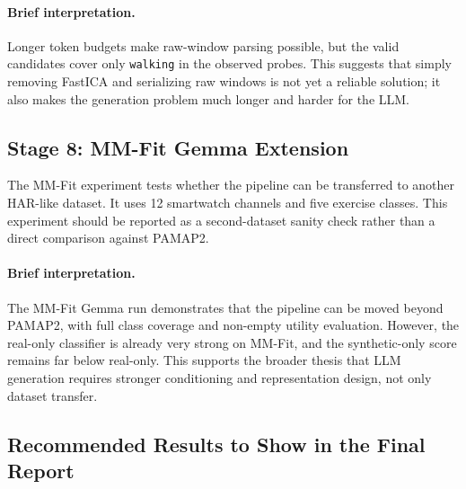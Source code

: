 \paragraph{Brief interpretation.}
Longer token budgets make raw-window parsing possible, but the valid candidates
cover only \texttt{walking} in the observed probes. This suggests that simply
removing FastICA and serializing raw windows is not yet a reliable solution; it
also makes the generation problem much longer and harder for the LLM.

\subsection*{Stage 8: MM-Fit Gemma Extension}

The MM-Fit experiment tests whether the pipeline can be transferred to another
HAR-like dataset. It uses 12 smartwatch channels and five exercise classes. This
experiment should be reported as a second-dataset sanity check rather than a
direct comparison against PAMAP2.

\begin{table}[t]
\centering
\small
\caption{MM-Fit Gemma-2 five-class result. This is a second-dataset extension,
not directly comparable to PAMAP2 absolute values.}
\label{tab:shanjun-mmfit}
\end{table}

\paragraph{Brief interpretation.}
The MM-Fit Gemma run demonstrates that the pipeline can be moved beyond PAMAP2,
with full class coverage and non-empty utility evaluation. However, the
real-only classifier is already very strong on MM-Fit, and the synthetic-only
score remains far below real-only. This supports the broader thesis that LLM
generation requires stronger conditioning and representation design, not only
dataset transfer.

\subsection*{Recommended Results to Show in the Final Report}

